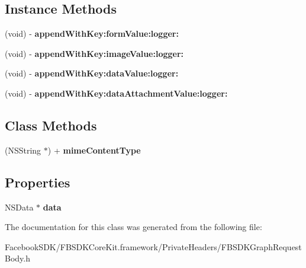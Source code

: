 \subsection*{Instance Methods}
\begin{DoxyCompactItemize}
\item 
\hypertarget{interface_f_b_s_d_k_graph_request_body_a2d162c0813b3eadc53881e8490e6e216}{(void) -\/ {\bfseries append\-With\-Key\-:form\-Value\-:logger\-:}}\label{interface_f_b_s_d_k_graph_request_body_a2d162c0813b3eadc53881e8490e6e216}

\item 
\hypertarget{interface_f_b_s_d_k_graph_request_body_ae46872ecd9a2dbae03f2082d6855cf97}{(void) -\/ {\bfseries append\-With\-Key\-:image\-Value\-:logger\-:}}\label{interface_f_b_s_d_k_graph_request_body_ae46872ecd9a2dbae03f2082d6855cf97}

\item 
\hypertarget{interface_f_b_s_d_k_graph_request_body_a79234342c0ea77285bfbf151165181f3}{(void) -\/ {\bfseries append\-With\-Key\-:data\-Value\-:logger\-:}}\label{interface_f_b_s_d_k_graph_request_body_a79234342c0ea77285bfbf151165181f3}

\item 
\hypertarget{interface_f_b_s_d_k_graph_request_body_aaa56bb212952d18322a5e4433d55eaf2}{(void) -\/ {\bfseries append\-With\-Key\-:data\-Attachment\-Value\-:logger\-:}}\label{interface_f_b_s_d_k_graph_request_body_aaa56bb212952d18322a5e4433d55eaf2}

\end{DoxyCompactItemize}
\subsection*{Class Methods}
\begin{DoxyCompactItemize}
\item 
\hypertarget{interface_f_b_s_d_k_graph_request_body_ad29668b30599e2d3c1efb5eea59e6143}{(N\-S\-String $\ast$) + {\bfseries mime\-Content\-Type}}\label{interface_f_b_s_d_k_graph_request_body_ad29668b30599e2d3c1efb5eea59e6143}

\end{DoxyCompactItemize}
\subsection*{Properties}
\begin{DoxyCompactItemize}
\item 
\hypertarget{interface_f_b_s_d_k_graph_request_body_a1e65a03ef55a4b7bff0711b6a6b6eebf}{N\-S\-Data $\ast$ {\bfseries data}}\label{interface_f_b_s_d_k_graph_request_body_a1e65a03ef55a4b7bff0711b6a6b6eebf}

\end{DoxyCompactItemize}


The documentation for this class was generated from the following file\-:\begin{DoxyCompactItemize}
\item 
Facebook\-S\-D\-K/\-F\-B\-S\-D\-K\-Core\-Kit.\-framework/\-Private\-Headers/F\-B\-S\-D\-K\-Graph\-Request\-Body.\-h\end{DoxyCompactItemize}
